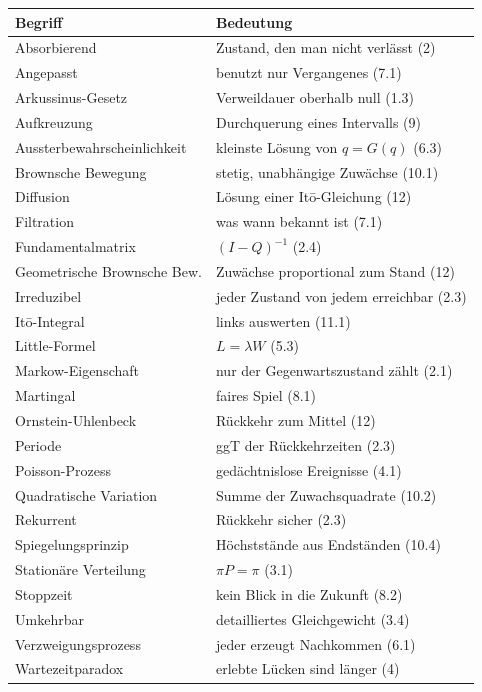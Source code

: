 \begin{merksatz}
\begin{center}
{\small
\renewcommand{\arraystretch}{1.3}
\begin{longtable}{@{}P{3.6cm}P{5.0cm}@{}}
\toprule
\textbf{Begriff} & \textbf{Bedeutung}\\
\midrule
\endhead
Absorbierend & Zustand, den man nicht verlässt (2)\\
Angepasst & benutzt nur Vergangenes (7.1)\\
Arkussinus-Gesetz & Verweildauer oberhalb null (1.3)\\
Aufkreuzung & Durchquerung eines Intervalls (9)\\
Aussterbe\-wahrschein\-lichkeit & kleinste Lösung von $q=G(q)$ (6.3)\\
Brownsche Bewegung & stetig, unabhängige Zuwächse (10.1)\\
Diffusion & Lösung einer Itō-Gleichung (12)\\
Filtration & was wann bekannt ist (7.1)\\
Fundamentalmatrix & $(I-Q)^{-1}$ (2.4)\\
Geometrische Brownsche Bew. & Zuwächse proportional zum Stand (12)\\
Irreduzibel & jeder Zustand von jedem erreichbar (2.3)\\
Itō-Integral & links auswerten (11.1)\\
Little-Formel & $L = \lambda W$ (5.3)\\
Markow-Eigenschaft & nur der Gegenwartszustand zählt (2.1)\\
Martingal & faires Spiel (8.1)\\
Ornstein-Uhlenbeck & Rückkehr zum Mittel (12)\\
Periode & ggT der Rückkehrzeiten (2.3)\\
Poisson-Prozess & gedächtnislose Ereignisse (4.1)\\
Quadratische Variation & Summe der Zuwachsquadrate (10.2)\\
Rekurrent & Rückkehr sicher (2.3)\\
Spiegelungsprinzip & Höchststände aus Endständen (10.4)\\
Stationäre Verteilung & $\pi P = \pi$ (3.1)\\
Stoppzeit & kein Blick in die Zukunft (8.2)\\
Umkehrbar & detailliertes Gleichgewicht (3.4)\\
Verzweigungsprozess & jeder erzeugt Nachkommen (6.1)\\
Wartezeitparadox & erlebte Lücken sind länger (4)\\
\bottomrule
\end{longtable}}
\end{center}
\end{merksatz}
